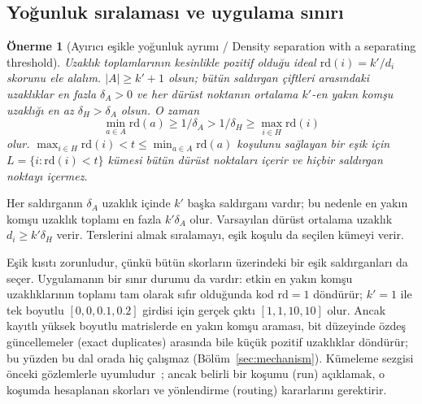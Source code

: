\documentclass[journal]{IEEEtran}
\newtheorem{proposition}{Önerme}
\newcommand{\rd}{\mathrm{rd}}
\begin{document}
\subsection{Yoğunluk sıralaması ve uygulama sınırı}
\begin{proposition}[Ayırıcı eşikle yoğunluk ayrımı / Density separation with a separating threshold]\label{prop:density}
Uzaklık toplamlarının kesinlikle pozitif olduğu ideal $\rd(i)=k'/d_i$ skorunu ele alalım. $|A|\geq k'+1$ olsun; bütün saldırgan çiftleri arasındaki uzaklıklar en fazla $\delta_A>0$ ve her dürüst noktanın ortalama $k'$-en yakın komşu uzaklığı en az $\delta_H>\delta_A$ olsun. O zaman
\[
\min_{a\in A}\rd(a)\geq1/\delta_A>1/\delta_H\geq\max_{i\in H}\rd(i)
\]
olur. $\max_{i\in H}\rd(i)<t\leq\min_{a\in A}\rd(a)$ koşulunu sağlayan bir eşik için $L=\{i:\rd(i)<t\}$ kümesi bütün dürüst noktaları içerir ve hiçbir saldırgan noktayı içermez.
\end{proposition}
\begin{IEEEproof}
Her saldırganın $\delta_A$ uzaklık içinde $k'$ başka saldırganı vardır; bu nedenle en yakın komşu uzaklık toplamı en fazla $k'\delta_A$ olur. Varsayılan dürüst ortalama uzaklık $d_i\geq k'\delta_H$ verir. Terslerini almak sıralamayı, eşik koşulu da seçilen kümeyi verir.
\end{IEEEproof}
Eşik kısıtı zorunludur, çünkü bütün skorların üzerindeki bir eşik saldırganları da seçer. Uygulamanın bir sınır durumu da vardır: etkin en yakın komşu uzaklıklarının toplamı tam olarak sıfır olduğunda kod $\rd=1$ döndürür; $k'=1$ ile tek boyutlu $[0,0,0.1,0.2]$ girdisi için gerçek çıktı $[1,1,10,10]$ olur. Ancak kayıtlı yüksek boyutlu matrislerde en yakın komşu araması, bit düzeyinde özdeş güncellemeler (exact duplicates) arasında bile küçük pozitif uzaklıklar döndürür; bu yüzden bu dal orada hiç çalışmaz (Bölüm~\ref{sec:mechanism}). Kümeleme sezgisi önceki gözlemlerle uyumludur~\cite{bellachia2026sok}; ancak belirli bir koşumu (run) açıklamak, o koşumda hesaplanan skorları ve yönlendirme (routing) kararlarını gerektirir.
\end{document}
